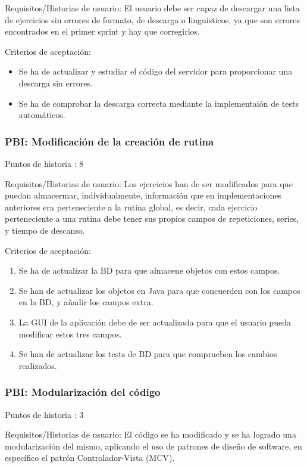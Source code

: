 \documentclass[11pt,a4paper]{report}
\begin{document}
Requisitos/Historias de usuario: El usuario debe ser capaz de descargar una lista de ejercicios sin errores de formato, de descarga o linguisticos, ya que son errores encontrados en el primer sprint y hay que corregirlos.

Criterios de aceptación:
\begin{itemize}
	\item Se ha de actualizar y estudiar el código del servidor para proporcionar una descarga sin errores.

	\item Se ha de comprobar la descarga correcta mediante la implementaión de tests automáticos.

\end{itemize}
\subsubsection{PBI: Modificación de la creación de rutina}
Puntos de historia : 8

Requisitos/Historias de usuario: Los ejercicios han de ser modificados para que puedan almacermar, individualmente, información que en implementaciones anteriores era perteneciente a la rutina global, es decir, cada ejercicio perteneciente a una rutina debe tener sus propios campos de repeticiones, series, y tiempo de descanso.

Criterios de aceptación:
\begin{enumerate}
	\item Se ha de actualizar la BD para que almacene objetos con estos campos.

	\item Se han de actualizar los objetos en Java para que concuerden con los campos en la BD, y añadir los campos extra.

	\item La GUI de la aplicación debe de ser actualizada para que el usuario pueda modificar estos tres campos.

	\item Se han de actualizar los tests de BD para que comprueben los cambios realizados.

\end{enumerate}
\subsubsection{PBI: Modularización del código}
Puntos de historia : 3

Requisitos/Historias de usuario: El código se ha modificado y se ha logrado una modularización del mismo, aplicando el uso de patrones de diseño de software, en específico el patrón Controlador-Vista (MCV).
\end{document}
